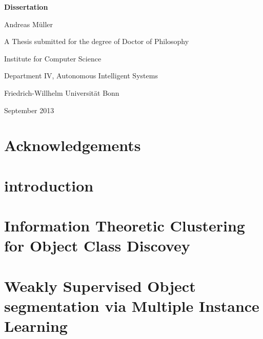 \documentclass[12pt,toc=bibnumbered, a4paper,twoside]{scrreprt}
\begin{document}


\begin{titlepage}
\begin{center}
\vspace*{1in}
\textbf{{\LARGE Dissertation}}
\par
\vspace{1.5in} {\large Andreas M\"uller}
 \par \vfill A Thesis submitted for the degree of Doctor of Philosophy
\par \vspace{0.5in}
Institute for Computer Science \par
Department IV, Autonomous Intelligent Systems
\par \vspace{0.5in}
Friedrich-Willhelm Universit\"at Bonn \par
\vspace{0.5in} September 2013 \end{center}

\end{titlepage}


\tableofcontents

\chapter*{Acknowledgements}

\begin{abstract} abstract
\end{abstract}


\chapter{introduction}

\chapter{Information Theoretic Clustering for Object Class Discovey}


\chapter{Weakly Supervised Object segmentation via Multiple Instance Learning}


\end{document}
